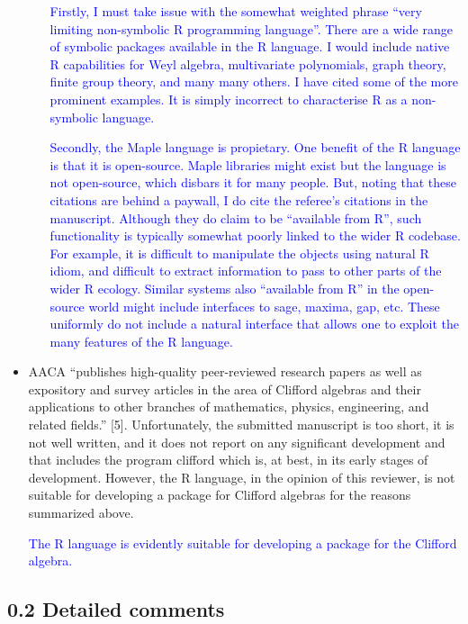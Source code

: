 \documentclass{article}
\begin{document}
\begin{itemize}
\begin{itemize}
\textcolor{blue}{Firstly, I must take issue with the somewhat weighted
  phrase ``very limiting non-symbolic R programming language''.  There
  are a wide range of symbolic packages available in the R language.
  I would include native R capabilities for Weyl algebra, multivariate
  polynomials, graph theory, finite group theory, and many many
  others.  I have cited some of the more prominent examples.  It is
  simply incorrect to characterise R as a non-symbolic language.}

  \textcolor{blue}{Secondly, the Maple language is propietary.  One
    benefit of the R language is that it is open-source.  Maple
    libraries might exist but the language is not open-source, which
    disbars it for many people.  But, noting that these citations are
    behind a paywall, I do cite the referee's citations in the
    manuscript.  Although they do claim to be ``available from R'',
    such functionality is typically somewhat poorly linked to the
    wider R codebase.  For example, it is difficult to manipulate the
    objects using natural R idiom, and difficult to extract
    information to pass to other parts of the wider R ecology.
    Similar systems also ``available from R'' in the open-source world
    might include interfaces to sage, maxima, gap, etc.  These
    uniformly do not include a natural interface that allows one to
    exploit the many features of the R language.
 }

\end{itemize}

\item AACA “publishes high-quality peer-reviewed research papers as well as expository and survey
articles in the area of Clifford algebras and their applications to other branches of mathematics,
physics, engineering, and related fields.” [5]. Unfortunately, the submitted manuscript is too short,
it is not well written, and it does not report on any significant development and that includes the
program clifford which is, at best, in its early stages of development. However, the R language,
in the opinion of this reviewer, is not suitable for developing a package for Clifford algebras for the
reasons summarized above.

\textcolor{blue}{The R language is evidently suitable for developing a
  package for the Clifford algebra.}

\end{itemize}

\subsection*{0.2 Detailed comments}
\end{document}
